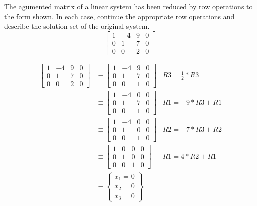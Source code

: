 \documentclass{../mathhomework}
\begin{document}
\begin{problem}[1.1\#8]
    The agumented matrix of a linear system has been reduced by row operations to the form shown.
    In each case, continue the appropriate row operations and describe the solution set of the original system.
    $$\begin{bmatrix}
        1 & -4 & 9 & 0 \\
        0 & 1 & 7 & 0 \\
        0 & 0 & 2 & 0
    \end{bmatrix}$$

    \begin{solution}
        \begin{align*}
                    \begin{bmatrix}
                        1 & -4 & 9 & 0 \\
                        0 & 1 & 7 & 0 \\
                        0 & 0 & 2 & 0
                    \end{bmatrix}
                    & \equiv
                    \begin{bmatrix}
                        1 & -4 & 9 & 0 \\
                        0 & 1 & 7 & 0 \\
                        0 & 0 & 1 & 0
                    \end{bmatrix}
                    & R3 = \frac{1}{2} * R3 \\ & \equiv
                    \begin{bmatrix}
                        1 & -4 & 0 & 0 \\
                        0 & 1 & 7 & 0 \\
                        0 & 0 & 1 & 0
                    \end{bmatrix}
                    & R1 = -9 * R3 + R1 \\ & \equiv
                    \begin{bmatrix}
                        1 & -4 & 0 & 0 \\
                        0 & 1 & 0 & 0 \\
                        0 & 0 & 1 & 0
                    \end{bmatrix}
                    & R2 = -7 * R3 + R2\\ & \equiv
                    \begin{bmatrix}
                        1 & 0 & 0 & 0 \\
                        0 & 1 & 0 & 0 \\
                        0 & 0 & 1 & 0
                    \end{bmatrix}
                    & R1 = 4 * R2 + R1 \\ & \equiv
                    \begin{Bmatrix}
                        x_1 = 0 \\
                        x_2 = 0 \\
                        x_3 = 0
                    \end{Bmatrix}
                \end{align*}    
                

\end{solution}
\end{problem}
\end{document}
